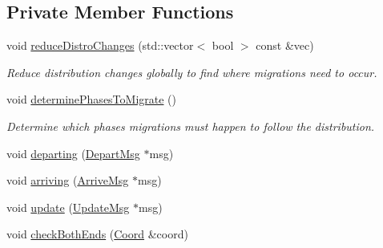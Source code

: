 \subsection*{Private Member Functions}
\begin{DoxyCompactItemize}
\item 
void \hyperlink{structvt_1_1vrt_1_1collection_1_1balance_1_1_l_b_data_restart_reader_aa84bd50943dd33158739b78973647930}{reduce\+Distro\+Changes} (std\+::vector$<$ bool $>$ const \&vec)
\begin{DoxyCompactList}\small\item\em Reduce distribution changes globally to find where migrations need to occur. \end{DoxyCompactList}\item 
void \hyperlink{structvt_1_1vrt_1_1collection_1_1balance_1_1_l_b_data_restart_reader_af9cb0f3ba080b54902909a34f6fe0fef}{determine\+Phases\+To\+Migrate} ()
\begin{DoxyCompactList}\small\item\em Determine which phases migrations must happen to follow the distribution. \end{DoxyCompactList}\item 
void \hyperlink{structvt_1_1vrt_1_1collection_1_1balance_1_1_l_b_data_restart_reader_a307888d173e79695956a9ed6dc247c7a}{departing} (\hyperlink{structvt_1_1vrt_1_1collection_1_1balance_1_1_l_b_data_restart_reader_1_1_depart_msg}{Depart\+Msg} $\ast$msg)
\item 
void \hyperlink{structvt_1_1vrt_1_1collection_1_1balance_1_1_l_b_data_restart_reader_abbdef5a1c61003624ef5a41d281ec355}{arriving} (\hyperlink{structvt_1_1vrt_1_1collection_1_1balance_1_1_l_b_data_restart_reader_1_1_arrive_msg}{Arrive\+Msg} $\ast$msg)
\item 
void \hyperlink{structvt_1_1vrt_1_1collection_1_1balance_1_1_l_b_data_restart_reader_ae5101e7bdafbc8c6d546330b0fbadd4f}{update} (\hyperlink{structvt_1_1vrt_1_1collection_1_1balance_1_1_l_b_data_restart_reader_1_1_update_msg}{Update\+Msg} $\ast$msg)
\item 
void \hyperlink{structvt_1_1vrt_1_1collection_1_1balance_1_1_l_b_data_restart_reader_a7d8669c0396398818721febf079213c9}{check\+Both\+Ends} (\hyperlink{structvt_1_1vrt_1_1collection_1_1balance_1_1_l_b_data_restart_reader_1_1_coord}{Coord} \&coord)
\end{DoxyCompactItemize}
